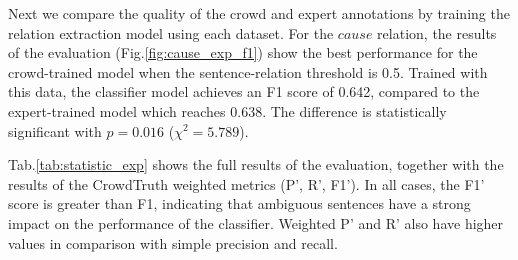 Next we compare the quality of the crowd and expert annotations by training the relation extraction model using each dataset. For the $cause$ relation, the results of the evaluation (Fig.\ref{fig:cause_exp_f1}) show the best performance for the crowd-trained model when the sentence-relation threshold is 0.5. Trained with this data, the classifier model achieves an F1 score of 0.642, compared to the expert-trained model which reaches 0.638. The difference is statistically significant with $p = 0.016$ ($\chi^2 = 5.789$).

Tab.\ref{tab:statistic_exp} shows the full results of the evaluation, together with the results of the CrowdTruth weighted metrics (P', R', F1'). In all cases, the F1' score is greater than F1, indicating that ambiguous sentences have a strong impact on the performance of the classifier. Weighted P' and R' also have higher values in comparison with simple precision and recall.

